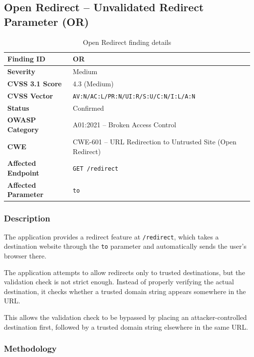 \subsection*{Open Redirect -- Unvalidated Redirect Parameter (OR)}

\begin{table}[H]
\centering
\begin{tabular}{|l|p{10cm}|}
\hline
\textbf{Finding ID} & OR \\
\hline
\textbf{Severity} & Medium \\
\hline
\textbf{CVSS 3.1 Score} & 4.3 (Medium) \\
\hline
\textbf{CVSS Vector} & \texttt{AV:N/AC:L/PR:N/UI:R/S:U/C:N/I:L/A:N} \\
\hline
\textbf{Status} & Confirmed \\
\hline
\textbf{OWASP Category} & A01:2021 -- Broken Access Control \\
\hline
\textbf{CWE} & CWE-601 -- URL Redirection to Untrusted Site (Open Redirect) \\
\hline
\textbf{Affected Endpoint} & \texttt{GET /redirect} \\
\hline
\textbf{Affected Parameter} & \texttt{to} \\
\hline
\end{tabular}
\caption{Open Redirect finding details}
\end{table}

\subsubsection*{Description}

The application provides a redirect feature at \texttt{/redirect},
which takes a destination website through the \texttt{to} parameter
and automatically sends the user's browser there.

The application attempts to allow redirects only to trusted
destinations, but the validation check is not strict enough.
Instead of properly verifying the actual destination, it checks
whether a trusted domain string appears somewhere in the URL.

This allows the validation check to be bypassed by placing an
attacker-controlled destination first, followed by a trusted domain
string elsewhere in the same URL.

\subsubsection*{Methodology}

